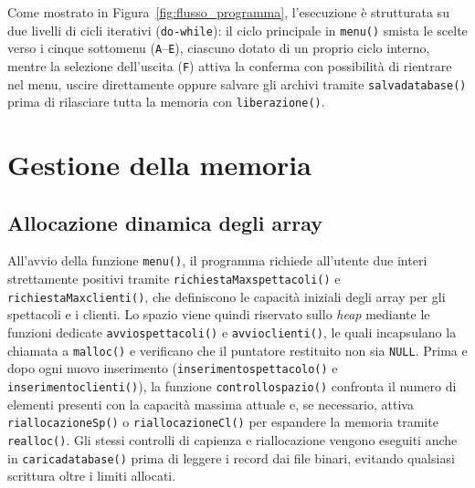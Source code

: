 \documentclass[11pt,a4paper,oneside,openany]{book}
\begin{document}
Come mostrato in Figura~\ref{fig:flusso_programma}, l'esecuzione è strutturata su due livelli di cicli iterativi (\texttt{do-while}): il ciclo principale in \texttt{menu()} smista le scelte verso i cinque sottomenu (\texttt{A}--\texttt{E}), ciascuno dotato di un proprio ciclo interno, mentre la selezione dell'uscita (\texttt{F}) attiva la conferma con possibilità di rientrare nel menu, uscire direttamente oppure salvare gli archivi tramite \texttt{salvadatabase()} prima di rilasciare tutta la memoria con \texttt{liberazione()}.

\section{Gestione della memoria}

\subsection{Allocazione dinamica degli array}
All'avvio della funzione \texttt{menu()}, il programma richiede all'utente due interi strettamente positivi tramite \texttt{richiestaMaxspettacoli()} e \texttt{richiestaMaxclienti()}, che definiscono le capacità iniziali degli array per gli spettacoli e i clienti. Lo spazio viene quindi riservato sullo \emph{heap} mediante le funzioni dedicate \texttt{avviospettacoli()} e \texttt{avvioclienti()}, le quali incapsulano la chiamata a \texttt{malloc()} e verificano che il puntatore restituito non sia \texttt{NULL}. Prima e dopo ogni nuovo inserimento (\texttt{inserimentospettacolo()} e \texttt{inserimentoclienti()}), la funzione \texttt{controllospazio()} confronta il numero di elementi presenti con la capacità massima attuale e, se necessario, attiva \texttt{riallocazioneSp()} o \texttt{riallocazioneCl()} per espandere la memoria tramite \texttt{realloc()}. Gli stessi controlli di capienza e riallocazione vengono eseguiti anche in \texttt{caricadatabase()} prima di leggere i record dai file binari, evitando qualsiasi scrittura oltre i limiti allocati.

\end{document}
